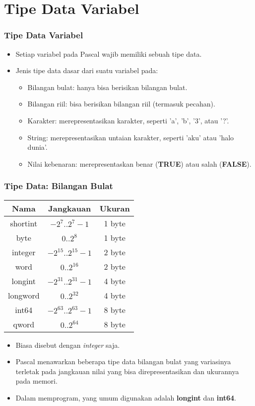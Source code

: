 \documentclass{beamer}
\begin{document}
\section{Tipe Data Variabel}
\frame{\sectionpage}

\begin{frame}
\frametitle{Tipe Data Variabel}
\begin{itemize}
	\item Setiap variabel pada Pascal wajib memiliki sebuah \alert{tipe data}.
	\item Jenis tipe data dasar dari suatu variabel pada:
	\begin{itemize}
		\item Bilangan bulat: hanya bisa berisikan bilangan bulat.
		\item Bilangan riil: bisa berisikan bilangan riil (termasuk pecahan).
		\item Karakter: merepresentasikan karakter, seperti 'a', 'b', '3', atau '?'.
		\item String: merepresentasikan untaian karakter, seperti 'aku' atau 'halo dunia'.
		\item Nilai kebenaran: merepresentaskan benar (\textbf{TRUE}) atau salah (\textbf{FALSE}).
	\end{itemize}
\end{itemize}
\end{frame}

\begin{frame}
\frametitle{Tipe Data: Bilangan Bulat}
\begin{table}[ht]
	\begin{tabular}{|c|c|c|}
		\hline Nama  & Jangkauan  & Ukuran \\ 
		\hline shortint & $-2^7 .. 2^7-1$ & 1 byte \\ 
		\hline byte & $0 .. 2^8$ & 1 byte\\ 
		\hline integer & $-2^{15} .. 2^{15}-1$ & 2 byte\\ 
		\hline word & $0 .. 2^{16}$ & 2 byte\\ 
		\hline longint & $-2^{31} .. 2^{31}-1$ & 4 byte\\ 
		\hline longword & $0 .. 2^{32}$ & 4 byte\\ 
		\hline int64 & $-2^{63} .. 2^{63}-1$ & 8 byte\\ 
		\hline qword & $0 .. 2^{64}$ & 8 byte\\ 
		\hline 
	\end{tabular}
\end{table} 
\begin{itemize}
	\item Biasa disebut dengan \textit{integer} saja.
	\item Pascal menawarkan beberapa tipe data bilangan bulat yang variasinya terletak pada jangkauan nilai yang bisa direpresentasikan dan ukurannya pada memori.
	\item Dalam memprogram, yang umum digunakan adalah \alert{\textbf{longint}} dan \alert{\textbf{int64}}. 
\end{itemize}
\end{frame}
\end{document}
